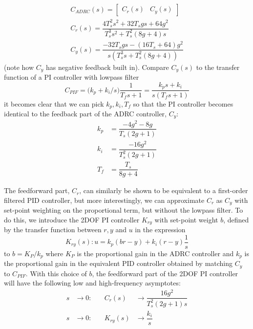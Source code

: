 \documentclass[letterpaper, 10 pt, conference]{ieeeconf}
\newcommand{\bmatrixx}[1]{\begin{bmatrix}#1\end{bmatrix}}
\begin{document}



\begin{align}
	C_{ADRC}(s) = \bmatrixx{C_r(s) & C_y(s)}\\
	C_r(s) = \dfrac{4T_{s}^2s^2 + 32T_{s}gs + 64g^2}{T_{s}^3s^2 + T_{s}^2(8g + 4)s} \\
	C_y(s) = \dfrac{- 32T_{s}gs -(16T_{s} + 64)g^2}{s(T_{s}^3s + T_{s}^2(8g + 4))}
\end{align}
(note how $C_y$ has negative feedback built in). Compare $C_y(s)$ to the transfer function of a PI controller with lowpass filter
$$C_{PIF} = \big(k_p + k_i/s \big)\dfrac{1}{T_f s + 1} = \dfrac{k_p s + k_i}{s(T_f s + 1)}$$
it becomes clear that we can pick $k_p, k_i, T_f$ so that the PI controller becomes identical to the feedback part of the ADRC controller, $C_y$:
\begin{align}
	k_p &= \dfrac{-4 g^2 - 8 g}{T_s(2 g + 1)} \label{eq:kp}\\
	k_i &= \dfrac{-16 g^2}{T_s^2(2g + 1)} \label{eq:ki}\\
	T_f &= \dfrac{T_s}{8 g + 4} \label{eq:Tf}
\end{align}



The feedforward part, $C_r$, can similarly be shown to be equivalent to a first-order filtered PID controller, but more interestingly, we can approximate $C_r$ as $C_y$ with set-point weighting on the proportional term, but without the lowpass filter. To do this, we introduce the 2DOF PI controller $K_{ry}$ with set-point weight $b$, defined by the transfer function between $r,y$ and $u$ in the expression
$$K_{ry}(s) : u = k_p (br - y) + k_i(r-y)\frac{1}{s}$$
to $b = K_P / k_p$ where $K_P$ is the proportional gain in the ADRC controller and $k_p$ is the proportional gain in the equivalent PID controller obtained by matching $C_y$ to $C_{PIF}$. With this choice of $b$, the feedforward part of the 2DOF PI controller will have the following low and high-frequency asymptotes:
\begin{align}
	s &\to 0:  & \quad C_r(s) &\to \dfrac{16g^2}{T_{s}^2(2g + 1)s} \\
	s &\to 0:  & \quad K_{ry}(s) &\to \dfrac{k_i}{s} 
\end{align}
\end{document}

